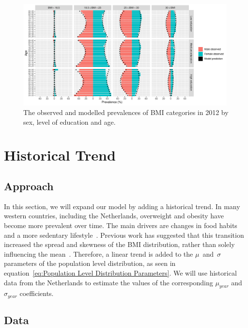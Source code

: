 \documentclass{imammb}
\numberwithin{equation}{section}
\begin{document}
\vspace{-3mm}

\begin{figure}[h]
\centering
\includegraphics[width=0.99\textwidth] {"Figures/Population Level Prevalences.pdf"}
\caption{The observed and modelled prevalences of BMI categories in 2012 by sex, level of education and age.}
\label{fig:Population Level Prevalences}
\vspace*{-9pt}
\end{figure}

\section{Historical Trend}
\label{sec:Historical Trend}

\subsection{Approach}
\label{sec:Historical Trend/Approach}

In this section, we will expand our model by adding a historical trend. In many western countries, including the Netherlands, overweight and obesity have become more prevalent over time. The main drivers are changes in food habits and a more sedentary lifestyle~\citep{Martinez-Gonzalez1999, Swinburn2011, Lopez-Valenciano2020}. Previous work has suggested that this transition increased the spread and skewness of the BMI distribution, rather than solely influencing the mean~\citep{Penman2006, Majer2013, Yamada2020}. Therefore, a linear trend is added to the $\mu$~and~$\sigma$ parameters of the population level distribution, as seen in equation~\ref{eq:Population Level Distribution Parameters}. We will use historical data from the Netherlands to estimate the values of the corresponding $\mu_{year}$ and $\sigma_{year}$ coefficients.

\subsection{Data}
\label{sec:Historical Trend/Data}
\end{document}
